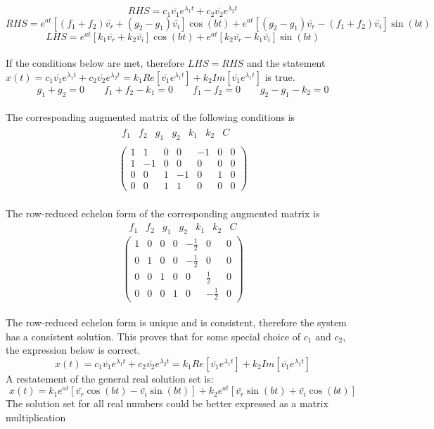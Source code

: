 \documentclass[a4paper, 12pt]{report}
\def\la{\lambda}
\def\f{\frac}
\def\dst{\displaystyle}
\def\b{\bar}
\begin{document}
\begin{center}
$$RHS = c_1\b{v_1}e^{\la_1 t} + c_2\b{v_2}e^{\la_2 t}$$
$$RHS = e^{at}[(f_1 + f_2)\b{v_r} +(g_2- g_1)\b{v_i}]\cos{(bt)} + e^{at}[(g_2 - g_1)\b{v_r} - (f_1 + f_2)\b{v_i}]\sin{(bt)}$$
$$LHS = e^{at}[k_1\b{v_r}+ k_2\b{v_i}]\cos{(bt)}  + e^{at}[k_2\b{v_r}- k_1\b{v_i}]\sin{(bt)}$$
\\If the conditions below are met, therefore $LHS = RHS$ and the statement $\dst{x(t) = c_1\b{v_1}e^{\la_1 t} + c_2\b{v_2}e^{\la_2 t} = k_1Re[\b{v_1}e^{\la_1 t}] + k_2Im[\b{v_1}e^{\la_1 t}]}$ is true. 
$$g_1 + g_2 =0 \qquad f_1 + f_2 - k_1 = 0 \qquad f_1 - f_2 = 0 \qquad g_2 - g_1 - k_2 = 0$$
\\The corresponding augmented matrix of the following conditions is
\begin{equation*}
\begin{split}
\begin{matrix}f_1 & f_2 & g_1 & g_2 & k_1 & k_2 & C \end{matrix} \\ \begin{pmatrix}1 & 1 & 0 &0 &-1 &0 &0 \\1 &-1 &0 &0 &0 &0 &0 \\ 0&0 &1 &-1 &0 &1 &0  \\ 0&0 &1 &1 &0 &0 &0 \end{pmatrix}
\end{split}
\end{equation*}
\\The row-reduced echelon form of the corresponding augmented matrix is
$$\begin{matrix} f_1 & f_2 & g_1 & g_2 & k_1 & k_2 & C \end{matrix}$$
$$\begin{pmatrix}1 &0 &0 &0 &-\f{1}{2} &0 &0 \\ 0& 1&0 &0 &-\f{1}{2} &0 &0 \\0 &0 &1 &0 &0 &\f{1}{2} & 0\\0 &0 &0 &1 &0 &-\f{1}{2} &0 \end{pmatrix}$$
\\The row-reduced echelon form is unique and is consistent, therefore the system has a consistent solution. This proves that for some special choice of $c_1$ and $c_2$, the expression below is correct.
$$x(t) = c_1\b{v_1}e^{\la_1 t} + c_2\b{v_2}e^{\la_2 t} = k_1Re[\b{v_1}e^{\la_1 t}] + k_2Im[\b{v_1}e^{\la_1 t}]$$
A restatement of the general real solution set is:
$$x(t)=k_1e^{at}[\b{v_r}\cos{(bt)} - \b{v_i}\sin{(bt)}] + k_2e^{at}[\b{v_r}\sin{(bt)} + \b{v_i}\cos{(bt)}]$$
The solution set for all real numbers could be better expressed as a matrix multiplication

\end{center}
\end{document}
